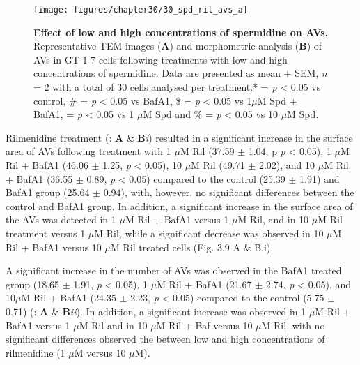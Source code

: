\begin{landscape}
\begin{figure}[!htbp]
\center
  \texttt{[image: figures/chapter30/30\_spd\_ril\_avs\_a]}
  \caption[Effect of low and high concentrations of spermidine on AVs]{\textbf{Effect of low and high concentrations of spermidine on AVs.} Representative TEM images (\textbf{A}) and morphometric analysis (\textbf{B}) of AVs in GT 1-7 cells following treatments with low and high concentrations of spermidine. Data are presented as mean $\pm$ SEM, \textit{n} = 2 with a total of 30 cells analysed per treatment.* = \textit{p} < 0.05 vs control, \# = \textit{p} < 0.05 vs BafA1, \$ = \textit{p} < 0.05 vs 1$\mu$M Spd + BafA1, \@ = \textit{p} < 0.05 vs 1 $\mu$M Spd and  \% = \textit{p} < 0.05 vs 10 $\mu$M Spd.}
  \label{fig:30_spd_ril_avs_a}
\end{figure} 
\end{landscape}

Rilmenidine treatment (: \textbf{A} \& \textbf{B}\textit{i}) resulted in a significant increase in the surface area of AVs following treatment with 1 $\mu$M Ril (37.59 $\pm$ 1.04, p \textit{p} < 0.05), 1 $\mu$M Ril + BafA1 (46.06 $\pm$ 1.25, \textit{p} < 0.05), 10 $\mu$M Ril (49.71 $\pm$ 2.02), and 10 $\mu$M Ril + BafA1 (36.55 $\pm$ 0.89, \textit{p} < 0.05) compared to the control (25.39 $\pm$ 1.91) and BafA1 group (25.64 $\pm$ 0.94), with, however, no significant differences between the control and BafA1 group. In addition, a significant increase in the surface area of the AVs was detected in 1 $\mu$M Ril + BafA1 versus 1 $\mu$M Ril, and in 10 $\mu$M Ril treatment versus 1 $\mu$M Ril, while a significant decrease was observed in 10 $\mu$M Ril + BafA1 versus 10 $\mu$M Ril  treated cells (Fig. 3.9 A \& B.i).

A significant increase in the number of AVs was observed in the BafA1 treated group (18.65 $\pm$ 1.91, \textit{p} < 0.05), 1 $\mu$M Ril + BafA1 (21.67 $\pm$ 2.74, \textit{p} < 0.05), and 10$\mu$M Ril + BafA1 (24.35 $\pm$ 2.23, \textit{p} < 0.05) compared to the control (5.75 $\pm$ 0.71) (: \textbf{A} \& \textbf{B}\textit{ii}). In addition, a significant increase was observed in 1 $\mu$M Ril + BafA1 versus 1 $\mu$M Ril and in 10 $\mu$M Ril + Baf versus 10 $\mu$M Ril, with no significant differences observed the between low and high concentrations of rilmenidine (1 $\mu$M versus 10 $\mu$M).

